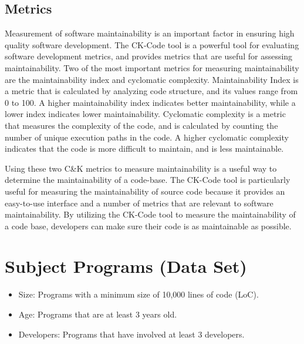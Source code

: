 \documentclass[conference]{IEEEtran}
\begin{document}
	\subsection{Metrics}
	Measurement of software maintainability is an important factor in ensuring high quality software development. The CK-Code tool is a powerful tool for evaluating software development metrics, and provides metrics that are useful for assessing maintainability. Two of the most important metrics for measuring maintainability are the maintainability index and cyclomatic complexity. Maintainability Index is a metric that is calculated by analyzing code structure, and its values range from 0 to 100. A higher maintainability index indicates better maintainability, while a lower index indicates lower maintainability. Cyclomatic complexity is a metric that measures the complexity of the code, and is calculated by counting the number of unique execution paths in the code. A higher cyclomatic complexity indicates that the code is more difficult to maintain, and is less maintainable. 
	
	Using these two C\&K metrics to measure maintainability is a useful way to determine the maintainability of a code-base. The CK-Code tool is particularly useful for measuring the maintainability of source code because it provides an easy-to-use interface and a number of metrics that are relevant to software maintainability. By utilizing the CK-Code tool to measure the maintainability of a code base, developers can make sure their code is as maintainable as possible.
	
	\section{Subject Programs (Data Set)}
	
	\begin{itemize}
		\item Size: Programs with a minimum size of 10,000 lines of code (LoC).
		\item Age: Programs that are at least 3 years old.
		\item Developers: Programs that have involved at least 3 developers.
	\end{itemize}
\end{document}
